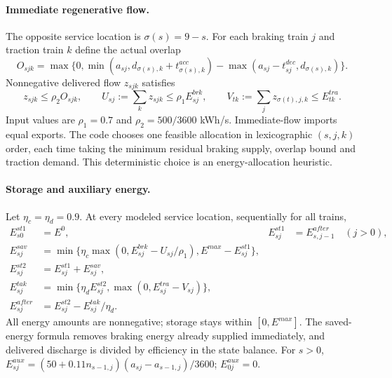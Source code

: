 \documentclass[11pt]{article}
\begin{document}
\paragraph{Immediate regenerative flow.}
The opposite service location is $\sigma(s)=9-s$.
For each braking train $j$ and traction train $k$ define the actual overlap
\[
 O_{sjk}=\max\{0,\min(a_{sj},d_{\sigma(s),k}+t^{acc}_{\sigma(s),k})
 -\max(a_{sj}-t^{dec}_{sj},d_{\sigma(s),k})\}.
\]
Nonnegative delivered flow $z_{sjk}$ satisfies
\[
 z_{sjk}\le \rho_2 O_{sjk},\qquad
 U_{sj}:=\sum_kz_{sjk}\le\rho_1E^{brk}_{sj},\qquad
 V_{tk}:=\sum_{j}z_{\sigma(t),j,k}\le E^{tra}_{tk}.
\]
Input values are $\rho_1=0.7$ and $\rho_2=500/3600$ kWh/s.
Immediate-flow imports equal exports. The code chooses one feasible allocation
in lexicographic $(s,j,k)$ order, each time taking the minimum residual
braking supply, overlap bound and traction demand. This deterministic choice
is an energy-allocation heuristic.

\paragraph{Storage and auxiliary energy.}
Let $\eta_c=\eta_d=0.9$.
At every modeled service location, sequentially for all trains,
\begin{align}
E^{st1}_{s0}&=E^0,&
E^{st1}_{sj}&=E^{after}_{s,j-1}\quad(j>0),\\
E^{sav}_{sj}&=\min\{\eta_c\max(0,E^{brk}_{sj}-U_{sj}/\rho_1),
                      E^{max}-E^{st1}_{sj}\},\\
E^{st2}_{sj}&=E^{st1}_{sj}+E^{sav}_{sj},\\
E^{tak}_{sj}&=\min\{\eta_d E^{st2}_{sj},\max(0,E^{tra}_{sj}-V_{sj})\},\\
E^{after}_{sj}&=E^{st2}_{sj}-E^{tak}_{sj}/\eta_d.
\end{align}
All energy amounts are nonnegative; storage stays within $[0,E^{max}]$.
The saved-energy formula removes braking energy already supplied immediately,
and delivered discharge is divided by efficiency in the state balance.
For $s>0$,
$E^{aux}_{sj}=(50+0.11n_{s-1,j})(a_{sj}-a_{s-1,j})/3600$;
$E^{aux}_{0j}=0$.
\end{document}
